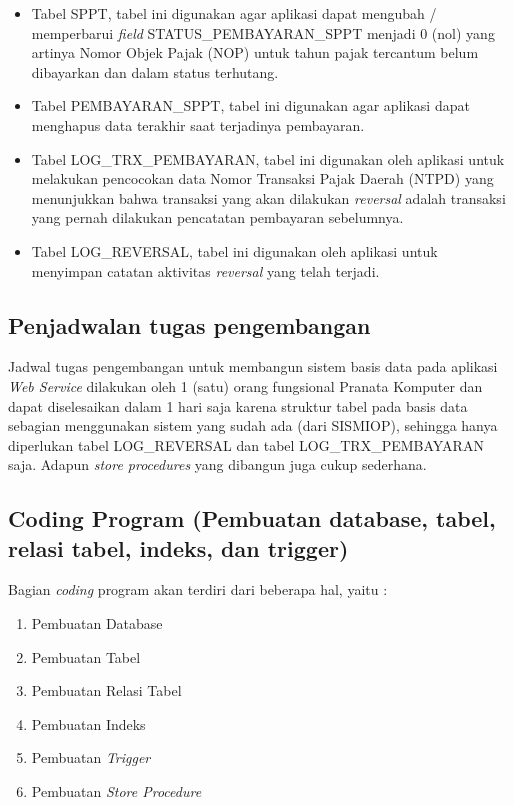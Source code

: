 \documentclass[pdftex,12pt, oneside]{article}
\begin{document}
\begin{enumerate}[1.]
	\begin{itemize}
		\item Tabel SPPT, tabel ini digunakan agar aplikasi dapat mengubah / memperbarui \textit{field} STATUS\_PEMBAYARAN\_SPPT menjadi 0 (nol) yang artinya Nomor Objek Pajak (NOP) untuk tahun pajak tercantum belum dibayarkan dan dalam status terhutang.
		\item Tabel PEMBAYARAN\_SPPT, tabel ini digunakan agar aplikasi dapat menghapus data terakhir saat terjadinya pembayaran.
		\item Tabel LOG\_TRX\_PEMBAYARAN, tabel ini digunakan oleh aplikasi untuk melakukan pencocokan data Nomor Transaksi Pajak Daerah (NTPD) yang menunjukkan bahwa transaksi yang akan dilakukan \textit{reversal} adalah transaksi yang pernah dilakukan pencatatan pembayaran sebelumnya.
		\item Tabel LOG\_REVERSAL, tabel ini digunakan oleh aplikasi untuk menyimpan catatan aktivitas \textit{reversal} yang telah terjadi.
	\end{itemize}
\end{enumerate}

\subsection{Penjadwalan tugas pengembangan}

Jadwal tugas pengembangan untuk membangun sistem basis data pada aplikasi \textit{Web Service} dilakukan oleh 1 (satu) orang fungsional Pranata Komputer dan dapat diselesaikan dalam 1 hari saja karena struktur tabel pada basis data sebagian menggunakan sistem yang sudah ada (dari SISMIOP), sehingga hanya diperlukan tabel LOG\_REVERSAL dan tabel LOG\_TRX\_PEMBAYARAN saja. Adapun \textit{store procedures} yang dibangun juga cukup sederhana.

\subsection{Coding Program (Pembuatan database, tabel, relasi tabel, indeks, dan trigger)}

Bagian \textit{coding} program akan terdiri dari beberapa hal, yaitu :

\begin{enumerate}[1.]
	\item Pembuatan Database
	\item Pembuatan Tabel
	\item Pembuatan Relasi Tabel
	\item Pembuatan Indeks
	\item Pembuatan \textit{Trigger}
	\item Pembuatan \textit{Store Procedure}
\end{enumerate}
\end{document}
